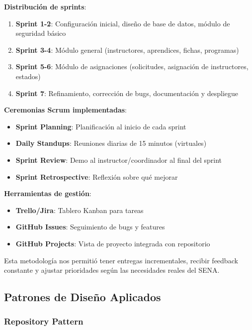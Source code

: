 \textbf{Distribución de sprints}:

\begin{enumerate}
    \item \textbf{Sprint 1-2}: Configuración inicial, diseño de base de datos, módulo de seguridad básico
    \item \textbf{Sprint 3-4}: Módulo general (instructores, aprendices, fichas, programas)
    \item \textbf{Sprint 5-6}: Módulo de asignaciones (solicitudes, asignación de instructores, estados)
    \item \textbf{Sprint 7}: Refinamiento, corrección de bugs, documentación y despliegue
\end{enumerate}

\textbf{Ceremonias Scrum implementadas}:
\begin{itemize}
    \item \textbf{Sprint Planning}: Planificación al inicio de cada sprint
    \item \textbf{Daily Standups}: Reuniones diarias de 15 minutos (virtuales)
    \item \textbf{Sprint Review}: Demo al instructor/coordinador al final del sprint
    \item \textbf{Sprint Retrospective}: Reflexión sobre qué mejorar
\end{itemize}

\textbf{Herramientas de gestión}:
\begin{itemize}
    \item \textbf{Trello/Jira}: Tablero Kanban para tareas
    \item \textbf{GitHub Issues}: Seguimiento de bugs y features
    \item \textbf{GitHub Projects}: Vista de proyecto integrada con repositorio
\end{itemize}

Esta metodología nos permitió tener entregas incrementales, recibir feedback constante y ajustar prioridades según las necesidades reales del SENA.

\subsection{Patrones de Diseño Aplicados}

\subsubsection{Repository Pattern}

